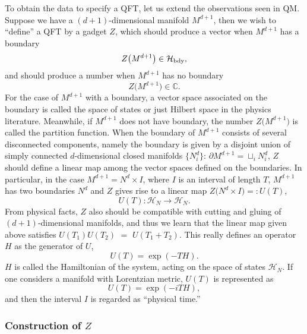 To obtain the data to specify a QFT, let us extend the
observations seen in QM. Suppose we have a $(d+1)$-dimensional manifold
$M^{d+1}$, then we wish to ``define'' a QFT by a gadget $Z$, which
should produce a vector when $M^{d+1}$ has a boundary
\begin{equation}
Z\big(M^{d+1}\big)  \in  \mathcal{H}_{\rm{bdy}},
\end{equation}
and should produce a number when $M^{d+1}$ has no boundary
\begin{equation}
Z\big(M^{d+1}\big)  \in  \mathbb{C}.
\end{equation}
For the case of $M^{d+1}$ with a boundary, a vector space associated
on the boundary is called the space of states or just Hilbert space
in the physics literature. Meanwhile, if $M^{d+1}$ does not
have boundary, the number $Z\big(M^{d+1}\big)$ is called the partition
function. When the boundary of $M^{d+1}$ consists of several disconnected components,
namely the boundary is given by a disjoint union of simply connected
$d$-dimensional closed manifolds $\big\{ N_{i}^{d}\big\}$: $\partial M^{d+1}=\sqcup_{i}N_{i}^{d}$,
$Z$ should define a linear map among the vector spaces defined on
the boundaries. In particular, in the case $M^{d+1}=N^{d}\times I$,
where $I$ is an interval of length $T$, $M^{d+1}$ has two boundaries
$N^{d}$ and $Z$ gives rise to a linear map $Z\big(N^{d}\times I\big)=:U(T)$,
\begin{equation}
  U(T) : \mathcal{H}_{N} \longrightarrow \mathcal{H}_{N}.
\end{equation}
From  physical facts, $Z$ also should be compatible with cutting and
gluing of $(d+1)$-dimensional manifolds, and thus we learn that the
linear map given above satisfies $U(T_{1})U(T_{2})$ $=$ $U(T_{1}+T_{2})$.
This really defines an operator $H$ as the generator of $U$,
\begin{equation}
  U(T)  =  \exp (-TH).
\end{equation}
$H$ is called the Hamiltonian of the system, acting on the space
of states $\mathcal{H}_{N}$. If one considers a manifold
with Lorentzian metric, $U(T)$ is represented as
\begin{equation}
  U(T)  =  \exp (-iTH),
\end{equation}
and then the interval $I$ is regarded as ``physical time.''







\subsubsection{Construction of $Z$}

